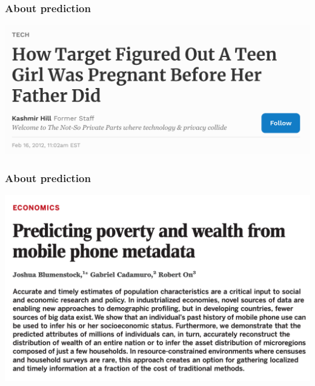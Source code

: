 \documentclass[aspectratio=43]{beamer}
\begin{document}
\begin{frame}
\frametitle{About prediction}
\centering

\includegraphics[width = \textwidth]{../img/target_pregnancy}

\end{frame}

\begin{frame}
\frametitle{About prediction}
\centering

\includegraphics[width = \textwidth]{../img/blumenstock}

\end{frame}
\end{document}
